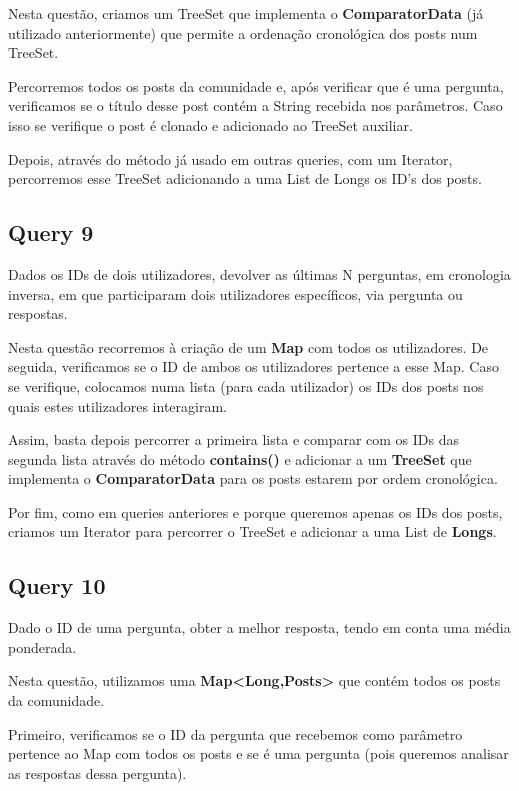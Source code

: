 \documentclass[a4paper]{article}
\begin{document}
Nesta questão, criamos um TreeSet que implementa o \textbf{ComparatorData} (já
utilizado anteriormente) que permite a ordenação cronológica dos posts num TreeSet.

Percorremos todos os posts da comunidade e, após verificar que é uma pergunta,
verificamos se o título desse post contém a String recebida nos parâmetros. Caso 
isso se verifique o post é clonado e adicionado ao TreeSet auxiliar.

Depois, através do método já usado em outras queries, com um Iterator, percorremos
esse TreeSet adicionando a uma List de Longs os ID's dos posts.

\subsection{Query 9}

Dados os IDs de dois utilizadores, devolver as últimas N perguntas, em
cronologia inversa, em que participaram dois utilizadores específicos, 
via pergunta ou respostas.

Nesta questão recorremos à criação de um \textbf{Map} com todos os utilizadores. 
De seguida, verificamos se o ID de ambos os utilizadores pertence a esse Map.
Caso se verifique, colocamos numa lista (para cada utilizador) os IDs dos posts 
nos quais estes utilizadores interagiram.

Assim, basta depois percorrer a primeira lista e comparar com os IDs das segunda
lista através do método \textbf{contains()} e adicionar a um \textbf{TreeSet} que
implementa o \textbf{ComparatorData} para os posts estarem por ordem cronológica.

Por fim, como em queries anteriores e porque queremos apenas os IDs dos posts,
criamos um Iterator para percorrer o TreeSet e adicionar a uma List de 
\textbf{Longs}.

\subsection{Query 10}

Dado o ID de uma pergunta, obter a melhor resposta, tendo em conta
uma média ponderada.

Nesta questão, utilizamos uma \textbf{Map<Long,Posts>} que contém todos os posts 
da comunidade.

Primeiro, verificamos se o ID da pergunta que recebemos como parâmetro pertence 
ao Map com todos os posts e se é uma pergunta (pois queremos analisar as respostas
dessa pergunta).
\end{document}
